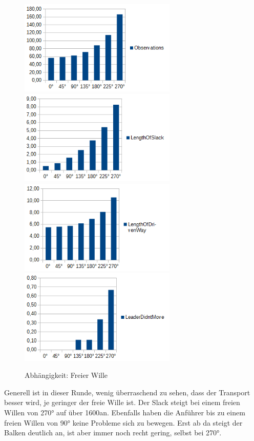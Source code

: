 \begin{figure}[h]
	\includegraphics[width=7.5cm,keepaspectratio]{graphics/Statistics/Transport/Angle_Observations.png}
	\includegraphics[width=7.5cm,keepaspectratio]{graphics/Statistics/Transport/Angle_Slack.png}
	\includegraphics[width=7.5cm,keepaspectratio]{graphics/Statistics/Transport/Angle_Way.png}
	\includegraphics[width=7.5cm,keepaspectratio]{graphics/Statistics/Transport/Angle_Move.png}
	\caption{Abhängigkeit: Freier Wille}
	\label{pic:TransportAngle}
\end{figure}

Generell ist in dieser Runde, wenig überraschend zu sehen, dass der Transport besser wird, je geringer der freie Wille ist. Der Slack steigt bei einem freien Willen von 270° auf über 1600\per an. Ebenfalls haben die Anführer bis zu einem freien Willen von 90° keine Probleme sich zu bewegen. Erst ab da steigt der Balken deutlich an, ist aber immer noch recht gering, selbst bei 270°.

